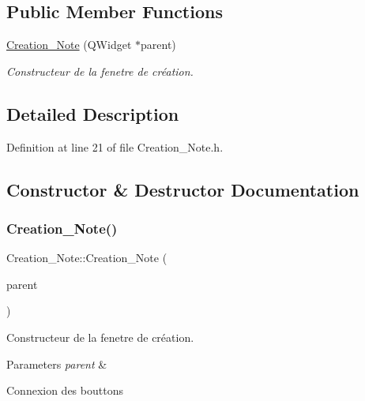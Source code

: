 \subsection*{Public Member Functions}
\begin{DoxyCompactItemize}
\item 
\hyperlink{class_creation___note_a76278cf9f0de87cd61f204aafcebd5d2}{Creation\+\_\+\+Note} (Q\+Widget $\ast$parent)
\begin{DoxyCompactList}\small\item\em Constructeur de la fenetre de création. \end{DoxyCompactList}\end{DoxyCompactItemize}


\subsection{Detailed Description}


Definition at line 21 of file Creation\+\_\+\+Note.\+h.



\subsection{Constructor \& Destructor Documentation}
\mbox{\label{class_creation___note_a76278cf9f0de87cd61f204aafcebd5d2}} 
\subsubsection{\texorpdfstring{Creation\+\_\+\+Note()}{Creation\_Note()}}
{\footnotesize\ttfamily Creation\+\_\+\+Note\+::\+Creation\+\_\+\+Note (\begin{DoxyParamCaption}\item[{Q\+Widget $\ast$}]{parent }\end{DoxyParamCaption})}



Constructeur de la fenetre de création. 


\begin{DoxyParams}{Parameters}
{\em parent} & \\
\hline
\end{DoxyParams}
Connexion des bouttons 

